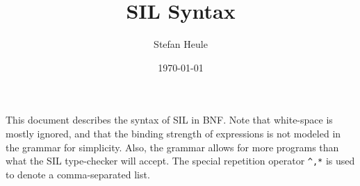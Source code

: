 \documentclass[]{article}
\title{SIL Syntax}
\author{Stefan Heule}
\date{\today}
\begin{document}
\maketitle


This document describes the syntax of SIL in BNF.  Note that white-space is
mostly ignored, and that the binding strength of expressions is not modeled
in the grammar for simplicity.  Also, the grammar allows for more programs
than what the SIL type-checker will accept.
The special repetition operator \lstinline[language=bnf]{^,*} is used to
denote a comma-separated list.


\lstset{language=bnf}

\end{document}
